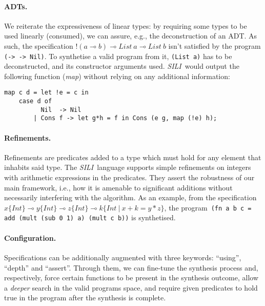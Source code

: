 \documentclass{llncs}
\newcommand{\lolli}{\multimap}
\newcommand{\bang}{{!}}
\newcommand{\synname}{\emph{SILI}}
\begin{document}
\paragraph{ADTs.} We reiterate the expressiveness of linear types: by requiring some types to be
used linearly (consumed), we can assure, e.g., the deconstruction of an
ADT. As such, the specification $\bang(a \lolli b) \lolli List\ a \lolli
List\ b$ isn't satisfied by the program \texttt{(\x -> \y -> Nil)}.
To synthetise a valid program from it, \texttt{(List a)} has to be
deconstructed, and its constructor arguments used. \synname\ would output the following
function (\emph{map}) without relying on any additional information:
%
\begin{verbatim}
map c d = let !e = c in
    case d of
          Nil  -> Nil
        | Cons f -> let g*h = f in Cons (e g, map (!e) h);
\end{verbatim}

\paragraph{Refinements.} Refinements are predicates added to a type which must hold for any
element that inhabits said type. The \synname\ language supports simple
refinements on integers with arithmetic expressions in the predicates. They
assert the robustness of our main framework, i.e., how it is amenable to
significant additions without necessarily interfering with the algorithm.
%
As an example, from the specification $x \{Int\} \lolli y \{Int\} \lolli z
\{Int\} \lolli k \{Int\ \vert\ x + k = y * z\}$, the
program\ \texttt{(fn a b c = add (mult (sub 0 1) a) (mult c b))} is
synthetised.

\paragraph{Configuration.} Specifications can be additionally augmented with three keywords: ``using'', ``depth'' and
``assert''. Through them, we can fine-tune the synthesis process and, respectively,
force certain functions to be present in the synthesis outcome, allow a
\emph{deeper} search in the valid programs space, and require given predicates
to hold true in the program after the synthesis is complete.
\end{document}
